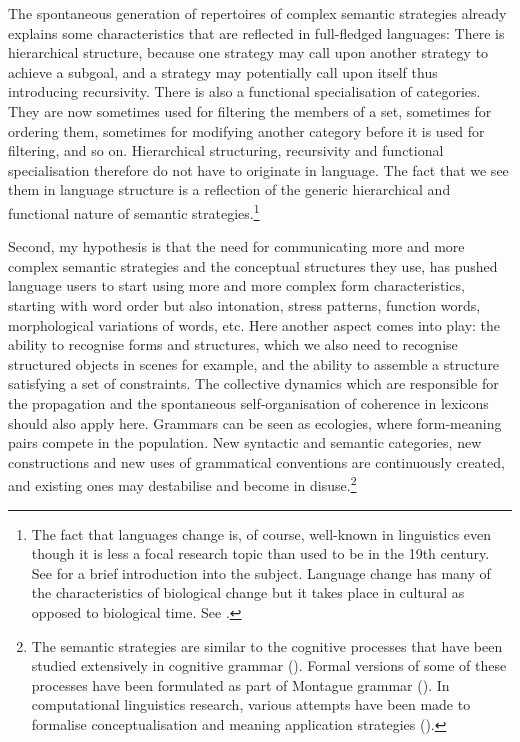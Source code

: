 The spontaneous generation of repertoires of complex 
semantic strategies already explains some characteristics 
that are reflected in full-fledged languages: 
There is hierarchical structure, because one strategy 
may call upon another strategy to achieve a subgoal, 
and a strategy may potentially call upon itself thus introducing 
recursivity. There is also a functional specialisation
of categories. They are now sometimes used for filtering
the members of a set, sometimes for ordering them, sometimes
for modifying another category before it is used for 
filtering, and so on. Hierarchical structuring, recursivity
and functional specialisation therefore do not have to 
originate in language. The fact that we see them in 
language structure is a reflection of the generic 
hierarchical and functional nature 
of semantic strategies.\footnote{The fact that languages change is, of course, 
well-known in linguistics even though it is less a focal 
research topic than used to be in the 19th century. 
See  \cite{McMahon:1994} for a brief introduction into the 
subject. Language change has many of the characteristics
of biological change but it takes place in cultural 
as opposed to biological time. See  \cite{Labov:1994}.}

Second, my hypothesis is that the need for communicating 
more and more complex semantic strategies and the 
conceptual structures they use, has pushed language 
users to start using more and more complex form characteristics, 
starting with word order but also intonation, stress 
patterns, function words, morphological variations of words, 
etc. Here another aspect comes into 
play: the ability to recognise forms and structures, 
which we also need to recognise structured objects in 
scenes for example, and the ability to assemble a 
structure satisfying a set of constraints. The collective
dynamics which are responsible for the propagation and the spontaneous 
self-organisation of coherence in lexicons should also apply  
here. Grammars can be seen as ecologies, where
form-meaning pairs compete in the population. New 
syntactic and semantic categories, new constructions and 
new uses of grammatical conventions are continuously created,
and existing ones may destabilise and become
in disuse.\footnote{The semantic strategies are similar to the 
cognitive processes that have been studied extensively 
in cognitive grammar (\citealt{Langacker:1987}). Formal versions
of some of these processes have been formulated as 
part of Montague grammar (\citealt{Montague:1974}). In 
computational linguistics research, various 
attempts have been made to formalise conceptualisation
and meaning application strategies (\citealt{Gazdar:1989}).}

